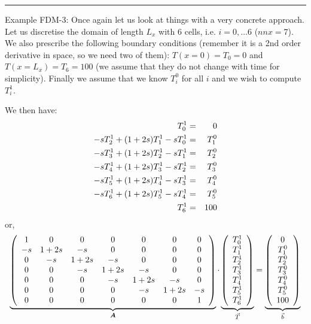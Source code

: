 \begin{center}
\begin{minipage}[t]{0.77\textwidth}
\par\noindent\rule{\textwidth}{0.4pt}
{\color{blue} Example FDM-3}: 
Once again let us look at things with a very concrete approach. Let us discretise the 
domain of length $L_x$ with 6 cells, i.e. $i=0,\dots 6$ ($nnx=7$).
We also prescribe the following boundary conditions (remember it is a 2nd order derivative in space, 
so we need two of them): $T(x=0)=T_0=0$ and $T(x=L_x)=T_6=100$ (we assume that they 
do not change with time for simplicity). Finally we assume that we 
know $T_i^0$ for all $i$ and we wish to compute $T_i^1$.

We then have:
\begin{eqnarray}
T_0^1 &=& 0 \nonumber\\
-s T_{2}^{1} + (1+2s) T_{1}^{1} - s T_{0}^{1} &=& T_1^{0} \nonumber\\
-s T_{3}^{1} + (1+2s) T_{2}^{1} - s T_{1}^{1} &=& T_2^{0} \nonumber\\
-s T_{4}^{1} + (1+2s) T_{3}^{1} - s T_{2}^{1} &=& T_3^{0} \nonumber\\
-s T_{5}^{1} + (1+2s) T_{4}^{1} - s T_{3}^{1} &=& T_4^{0} \nonumber\\
-s T_{6}^{1} + (1+2s) T_{5}^{1} - s T_{4}^{1} &=& T_5^{0} \nonumber\\
T_6^1 &=& 100
\end{eqnarray}
or, 
\begin{equation}
\underbrace{
\left(
\begin{array}{ccccccc}
1 & 0 & 0 & 0 & 0 & 0 & 0  \\
-s & 1+2s & -s & 0 & 0 & 0 & 0 \\
0 & -s & 1+2s & -s & 0 & 0 & 0 \\
0 & 0 & -s & 1+2s & -s & 0 & 0 \\
0 & 0 & 0 & -s & 1+2s & -s & 0 \\
0 & 0 & 0 & 0 & -s & 1+2s & -s \\
0 & 0 & 0 & 0 & 0 & 0 & 1
\end{array}
\right)
}_{\bm A}
\cdot
\underbrace{
\left(
\begin{array}{ccccccc}
T_0^1 \\ T_1^1 \\ T_2^1 \\ T_3^1 \\ T_4^1 \\ T_5^1 \\ T_6^1  
\end{array}
\right)
}_{\vec{T}}
=
\underbrace{
\left(
\begin{array}{ccccccc}
0 \\ T_1^0\\ T_2^0\\ T_3^0\\ T_4^0\\ T_5^0 \\ 100
\end{array}
\right)
}_{\vec{b}} \nonumber
\end{equation}


\end{minipage}
\end{center}
